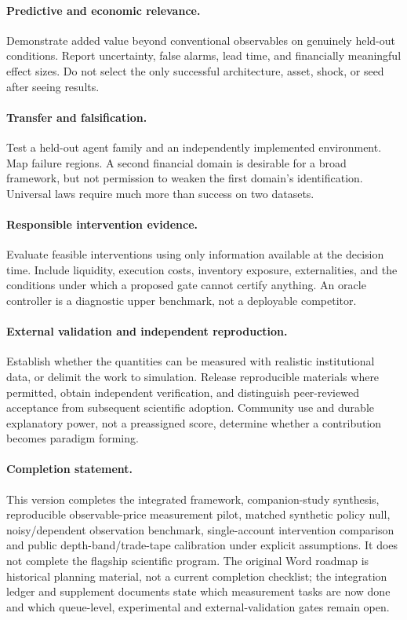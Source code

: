 \documentclass[11pt,a4paper]{article}
\theoremstyle{definition}
\theoremstyle{remark}
\begin{document}
\paragraph{Predictive and economic relevance.}
Demonstrate added value beyond conventional observables on genuinely held-out conditions. Report uncertainty, false alarms, lead time, and financially meaningful effect sizes. Do not select the only successful architecture, asset, shock, or seed after seeing results.

\paragraph{Transfer and falsification.}
Test a held-out agent family and an independently implemented environment. Map failure regions. A second financial domain is desirable for a broad framework, but not permission to weaken the first domain's identification. Universal laws require much more than success on two datasets.

\paragraph{Responsible intervention evidence.}
Evaluate feasible interventions using only information available at the decision time. Include liquidity, execution costs, inventory exposure, externalities, and the conditions under which a proposed gate cannot certify anything. An oracle controller is a diagnostic upper benchmark, not a deployable competitor.

\paragraph{External validation and independent reproduction.}
Establish whether the quantities can be measured with realistic institutional data, or delimit the work to simulation. Release reproducible materials where permitted, obtain independent verification, and distinguish peer-reviewed acceptance from subsequent scientific adoption. Community use and durable explanatory power, not a preassigned score, determine whether a contribution becomes paradigm forming.

\paragraph{Completion statement.}
This version completes the integrated framework, companion-study synthesis, reproducible observable-price measurement pilot, matched synthetic policy null, noisy/dependent observation benchmark, single-account intervention comparison and public depth-band/trade-tape calibration under explicit assumptions. It does not complete the flagship scientific program. The original Word roadmap is historical planning material, not a current completion checklist; the integration ledger and supplement documents state which measurement tasks are now done and which queue-level, experimental and external-validation gates remain open.
\end{document}
